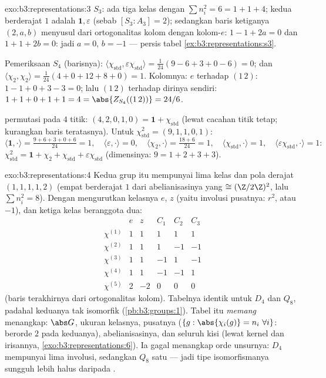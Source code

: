 \begin{solution}{exo:b3:representations:3}
$S_3$: ada tiga kelas dengan $\sum n_i^2 = 6 = 1 + 1 + 4$; kedua
 berderajat $1$ adalah $\mathbf 1, \varepsilon$ (sebab $[S_3 :
A_3] = 2$); sedangkan baris ketiganya $(2, a, b)$ menyusul dari ortogonalitas
kolom dengan kolom-$e$: $1 - 1 + 2a = 0$ dan $1 + 1 +
2b = 0$: jadi $a = 0$, $b = -1$ --- persis tabel
\cref{ex:b3:representations:s3}.

Pemeriksaan $S_4$ (barisnya): $\langle\chi_{\mathrm{std}},
\varepsilon\chi_{\mathrm{std}}\rangle = \frac1{24}(9 - 6 + 3 + 0
- 6) = 0$; dan $\langle\chi_2,\chi_2\rangle = \frac1{24}(4 + 0 + 12
+ 8 + 0) = 1$. Kolomnya: $e$ terhadap $(1\,2)$: $1 - 1 + 0 + 3 - 3
= 0$; lalu $(1\,2)$ terhadap dirinya sendiri: $1 + 1 + 0 + 1 + 1 = 4 =
\abs{Z_{S_4}((1\,2))} = 24/6$.

 permutasi pada $4$ titik: $(4, 2, 0, 1, 0) = \mathbf
1 + \chi_{\mathrm{std}}$ (lewat cacahan titik tetap; kurangkan baris
teratasnya). Untuk $\chi_{\mathrm{std}}^2 = (9, 1, 1, 0, 1)$:
\[
\langle\mathbf1,\cdot\rangle = \tfrac{9 + 6 + 3 + 0 + 6}{24} =
1,\quad
\langle\varepsilon,\cdot\rangle = 0,\quad
\langle\chi_2,\cdot\rangle = \tfrac{18 + 6}{24} = 1,\quad
\langle\chi_{\mathrm{std}},\cdot\rangle = 1,\quad
\langle\varepsilon\chi_{\mathrm{std}},\cdot\rangle = 1:
\]
$\chi_{\mathrm{std}}^2 = \mathbf 1 + \chi_2 +
\chi_{\mathrm{std}} + \varepsilon\chi_{\mathrm{std}}$
(dimensinya: $9 = 1 + 2 + 3 + 3$).
\end{solution}

\begin{solution}{exo:b3:representations:4}
Kedua grup itu mempunyai lima kelas dan pola derajat $(1,1,1,1,2)$
(empat  berderajat $1$ dari abelianisasinya yang $\cong (\Z/2\Z)^2$,
lalu $\sum n_i^2 = 8$). Dengan mengurutkan kelasnya $e$, $z$ (yaitu
involusi pusatnya: $r^2$, atau $-1$), dan ketiga
kelas beranggota dua:
\[
\begin{array}{c|ccccc}
& e & z & C_1 & C_2 & C_3\\
\hline
\chi^{(1)} & 1 & 1 & 1 & 1 & 1\\
\chi^{(2)} & 1 & 1 & 1 & -1 & -1\\
\chi^{(3)} & 1 & 1 & -1 & 1 & -1\\
\chi^{(4)} & 1 & 1 & -1 & -1 & 1\\
\chi^{(5)} & 2 & -2 & 0 & 0 & 0
\end{array}
\]
(baris terakhirnya dari ortogonalitas kolom). Tabelnya identik untuk
$D_4$ dan $Q_8$, padahal keduanya tak isomorfik
(\cref{pb:b3:groups:1}). Tabel itu \emph{memang} menangkap: $\abs
G$, ukuran kelasnya, pusatnya ($\{g : \abs{\chi_i(g)} = n_i\
\forall i\}$: berorde $2$ pada keduanya), abelianisasinya, dan seluruh
kisi \omterm{def:b3:groups:normal}{subgrup normalnya} (lewat kernel dan irisannya,
\cref{exo:b3:representations:6}). Ia gagal menangkap orde
unsurnya: $D_4$ mempunyai lima involusi, sedangkan $Q_8$ satu --- jadi
tipe isomorfismanya sungguh lebih halus daripada .
\end{solution}

